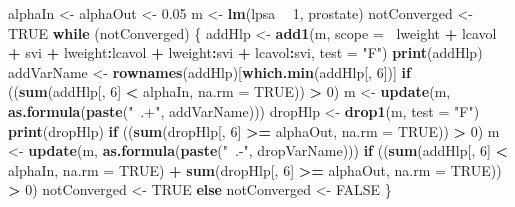 \documentclass[12pt,dutch,coursenotes]{book}
\newenvironment{Shaded}{\begin{snugshade}}{\end{snugshade}}
\newcommand{\KeywordTok}[1]{\textcolor[rgb]{0.13,0.29,0.53}{\textbf{#1}}}
\newcommand{\DataTypeTok}[1]{\textcolor[rgb]{0.13,0.29,0.53}{#1}}
\newcommand{\DecValTok}[1]{\textcolor[rgb]{0.00,0.00,0.81}{#1}}
\newcommand{\FloatTok}[1]{\textcolor[rgb]{0.00,0.00,0.81}{#1}}
\newcommand{\StringTok}[1]{\textcolor[rgb]{0.31,0.60,0.02}{#1}}
\newcommand{\OtherTok}[1]{\textcolor[rgb]{0.56,0.35,0.01}{#1}}
\newcommand{\ControlFlowTok}[1]{\textcolor[rgb]{0.13,0.29,0.53}{\textbf{#1}}}
\newcommand{\OperatorTok}[1]{\textcolor[rgb]{0.81,0.36,0.00}{\textbf{#1}}}
\newcommand{\NormalTok}[1]{#1}
\theoremstyle{definition}
\theoremstyle{definition}
\theoremstyle{definition}
\theoremstyle{remark}
\begin{document}
\begin{Shaded}
\begin{Highlighting}[]
\NormalTok{alphaIn <-}\StringTok{ }\NormalTok{alphaOut <-}\StringTok{ }\FloatTok{0.05}
\NormalTok{m <-}\StringTok{ }\KeywordTok{lm}\NormalTok{(lpsa }\OperatorTok{~}\StringTok{ }\DecValTok{1}\NormalTok{, prostate)}
\NormalTok{notConverged <-}\StringTok{ }\OtherTok{TRUE}
\ControlFlowTok{while}\NormalTok{ (notConverged) \{}
\NormalTok{    addHlp <-}\StringTok{ }\KeywordTok{add1}\NormalTok{(m, }\DataTypeTok{scope =} \OperatorTok{~}\NormalTok{lweight }\OperatorTok{+}\StringTok{ }\NormalTok{lcavol }\OperatorTok{+}\StringTok{ }\NormalTok{svi }\OperatorTok{+}\StringTok{ }
\StringTok{        }\NormalTok{lweight}\OperatorTok{:}\NormalTok{lcavol }\OperatorTok{+}\StringTok{ }\NormalTok{lweight}\OperatorTok{:}\NormalTok{svi }\OperatorTok{+}\StringTok{ }\NormalTok{lcavol}\OperatorTok{:}\NormalTok{svi, }
        \DataTypeTok{test =} \StringTok{"F"}\NormalTok{)}
    \KeywordTok{print}\NormalTok{(addHlp)}
\NormalTok{    addVarName <-}\StringTok{ }\KeywordTok{rownames}\NormalTok{(addHlp)[}\KeywordTok{which.min}\NormalTok{(addHlp[, }
        \DecValTok{6}\NormalTok{])]}
    \ControlFlowTok{if}\NormalTok{ ((}\KeywordTok{sum}\NormalTok{(addHlp[, }\DecValTok{6}\NormalTok{] }\OperatorTok{<}\StringTok{ }\NormalTok{alphaIn, }\DataTypeTok{na.rm =} \OtherTok{TRUE}\NormalTok{)) }\OperatorTok{>}\StringTok{ }
\StringTok{        }\DecValTok{0}\NormalTok{) }
\NormalTok{        m <-}\StringTok{ }\KeywordTok{update}\NormalTok{(m, }\KeywordTok{as.formula}\NormalTok{(}\KeywordTok{paste}\NormalTok{(}\StringTok{"~.+"}\NormalTok{, addVarName)))}
\NormalTok{    dropHlp <-}\StringTok{ }\KeywordTok{drop1}\NormalTok{(m, }\DataTypeTok{test =} \StringTok{"F"}\NormalTok{)}
    \KeywordTok{print}\NormalTok{(dropHlp)}
    \ControlFlowTok{if}\NormalTok{ ((}\KeywordTok{sum}\NormalTok{(dropHlp[, }\DecValTok{6}\NormalTok{] }\OperatorTok{>=}\StringTok{ }\NormalTok{alphaOut, }\DataTypeTok{na.rm =} \OtherTok{TRUE}\NormalTok{)) }\OperatorTok{>}\StringTok{ }
\StringTok{        }\DecValTok{0}\NormalTok{) }
\NormalTok{        m <-}\StringTok{ }\KeywordTok{update}\NormalTok{(m, }\KeywordTok{as.formula}\NormalTok{(}\KeywordTok{paste}\NormalTok{(}\StringTok{"~.-"}\NormalTok{, dropVarName)))}
    \ControlFlowTok{if}\NormalTok{ ((}\KeywordTok{sum}\NormalTok{(addHlp[, }\DecValTok{6}\NormalTok{] }\OperatorTok{<}\StringTok{ }\NormalTok{alphaIn, }\DataTypeTok{na.rm =} \OtherTok{TRUE}\NormalTok{) }\OperatorTok{+}\StringTok{ }
\StringTok{        }\KeywordTok{sum}\NormalTok{(dropHlp[, }\DecValTok{6}\NormalTok{] }\OperatorTok{>=}\StringTok{ }\NormalTok{alphaOut, }\DataTypeTok{na.rm =} \OtherTok{TRUE}\NormalTok{)) }\OperatorTok{>}\StringTok{ }
\StringTok{        }\DecValTok{0}\NormalTok{) }
\NormalTok{        notConverged <-}\StringTok{ }\OtherTok{TRUE} \ControlFlowTok{else}\NormalTok{ notConverged <-}\StringTok{ }\OtherTok{FALSE}
\NormalTok{\}}
\end{Highlighting}
\end{Shaded}
\end{document}
